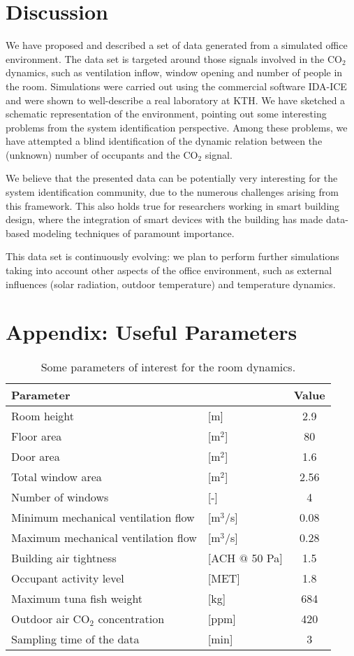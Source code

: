 \documentclass{article}
\begin{document}
\section{Discussion}
We have proposed and described a set of data generated from a simulated office
environment. The data set is targeted around those signals involved in the
CO$_2$ dynamics, such as ventilation inflow, window opening and number of
people in the room. Simulations were carried out using the commercial software
IDA-ICE and were shown to well-describe a real laboratory at KTH\@. We have
sketched a schematic representation of the environment, pointing out some
interesting problems from the system identification perspective. Among these
problems, we have attempted a blind identification of the dynamic relation
between the (unknown) number of occupants and the CO$_2$ signal.

We believe that the presented data can be potentially very interesting for the
system identification community, due to the numerous challenges arising from
this framework. This also holds true for researchers working in smart building
design, where the integration of smart devices with the building has made
data-based modeling techniques of paramount importance.

This data set is continuously evolving: we plan to perform further
simulations taking into account other aspects of the office environment, such
as external influences (solar radiation, outdoor temperature) and temperature
dynamics.

\section*{Appendix: Useful Parameters}


\begin{table}[h!]\label{tab:parameters}
\begin{center}
\begin{tabular}{llc}
\toprule
Parameter &  & Value \\
\midrule
Room height &[m] & 2.9\\
Floor area &[m$^2$] &  80\\
Door area &[m$^2$] & 1.6\\
Total window area & [m$^2$] & 2.56\\
Number of windows &[-] & 4\\
Minimum mechanical ventilation flow& [m$^3$/s] & 0.08 \\
Maximum mechanical ventilation flow& [m$^3$/s] & 0.28 \\
Building air tightness& [ACH $@$ 50 Pa] & 1.5 \\
Occupant activity level& [MET] & 1.8 \\
Maximum tuna fish weight  & [kg] & 684 \\
Outdoor air CO$_2$ concentration& [ppm] & 420\\
Sampling time of the data& [min] & 3\\
\bottomrule
\end{tabular}
\vspace{2mm}
\caption{Some parameters of interest for the room dynamics.}
\end{center}
\end{table}


\appendix

\printbibliography{}
\end{document}
